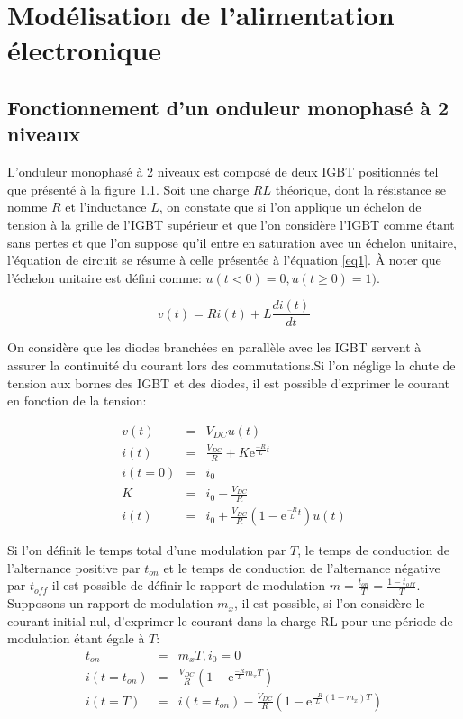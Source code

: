 \documentclass[11pt,letterpaper,final]{report}
\begin{document}
\chapter{Modélisation de l'alimentation électronique}
\section{Fonctionnement d'un onduleur monophasé à 2 niveaux}
L'onduleur monophasé à 2 niveaux est composé de deux IGBT positionnés tel que présenté à la figure \ref{}. Soit une charge $RL$ théorique, dont la résistance se nomme $R$ et l'inductance $L$, on constate que si l'on applique un échelon de tension à la grille de l'IGBT supérieur et que l'on considère l'IGBT comme étant sans pertes et que l'on suppose qu'il entre en saturation avec un échelon unitaire, l'équation de circuit se résume à celle présentée à l'équation \ref{eq1}. À noter que l'échelon unitaire est défini comme: $u(t<0) = 0, u(t\geq 0) = 1)$.

\begin{equation}
\label{eq1}
v(t) = R i(t) + L \frac{d i(t)}{dt}
\end{equation}

On considère que les diodes branchées en parallèle avec les IGBT servent à assurer la continuité du courant lors des commutations.Si l'on néglige la chute de tension aux bornes des IGBT et des diodes, il est possible d'exprimer le courant en fonction de la tension:

\begin{eqnarray}
v(t) &=& V_{DC} u(t)\\
i(t) &=& \frac{V_{DC}}{R} + K \mbox{e}^{\frac{-R}{L}t}\\
i(t=0) &=& i_0\\
K &=& i_0 - \frac{V_{DC}}{R} \\
i(t) &=& i_0  + \frac{V_{DC}}{R}\left(1 - \mbox{e}^{\frac{-R}{L}t}\right)u(t)
\end{eqnarray}

Si l'on définit le temps total d'une modulation par $T$, le temps de conduction de l'alternance positive par $t_{on}$ et le temps de conduction de l'alternance négative par $t_{off}$ il est possible de définir le rapport de modulation $m = \frac{t_{on}}{T} = \frac{1-t_{off}}{T}$. Supposons un rapport de modulation $m_x$, il est possible, si l'on considère le courant initial nul, d'exprimer le courant dans la charge RL pour une période de modulation étant égale à $T$:
\begin{eqnarray}
t_{on} &=& m_x T, i_0 = 0\\
i\left(t = t_{on}\right) &=& \frac{V_{DC}}{R}\left(1 - \mbox{e}^{\frac{-R}{L}m_x T}\right)\\
i\left(t = T\right) &=& i\left(t = t_{on}\right) -  \frac{V_{DC}}{R}\left(1 - \mbox{e}^{\frac{-R}{L}(1-m_x)T}\right)
\end{eqnarray}
\end{document}
